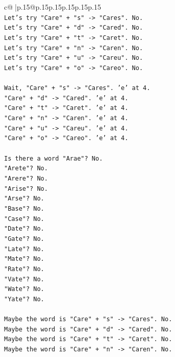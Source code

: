 \documentclass{article}
\begin{document}
{\begin{supertabular}{c@{$\;$}|p{.15\linewidth}@{}p{.15\linewidth}p{.15\linewidth}p{.15\linewidth}p{.15\linewidth}p{.15\linewidth}}
{{{\\ 
\texttt{Let's try "Care" + "s" {-}> "Cares". No.} \\
\texttt{Let's try "Care" + "d" {-}> "Cared". No.} \\
\texttt{Let's try "Care" + "t" {-}> "Caret". No.} \\
\texttt{Let's try "Care" + "n" {-}> "Caren". No.} \\
\texttt{Let's try "Care" + "u" {-}> "Careu". No.} \\
\texttt{Let's try "Care" + "o" {-}> "Careo". No.} \\
\\ 
\texttt{Wait, "Care" + "s" {-}> "Cares". 'e' at 4.} \\
\texttt{"Care" + "d" {-}> "Cared". 'e' at 4.} \\
\texttt{"Care" + "t" {-}> "Caret". 'e' at 4.} \\
\texttt{"Care" + "n" {-}> "Caren". 'e' at 4.} \\
\texttt{"Care" + "u" {-}> "Careu". 'e' at 4.} \\
\texttt{"Care" + "o" {-}> "Careo". 'e' at 4.} \\
\\ 
\texttt{Is there a word "Arae"? No.} \\
\texttt{"Arete"? No.} \\
\texttt{"Arere"? No.} \\
\texttt{"Arise"? No.} \\
\texttt{"Arse"? No.} \\
\texttt{"Base"? No.} \\
\texttt{"Case"? No.} \\
\texttt{"Date"? No.} \\
\texttt{"Gate"? No.} \\
\texttt{"Late"? No.} \\
\texttt{"Mate"? No.} \\
\texttt{"Rate"? No.} \\
\texttt{"Vate"? No.} \\
\texttt{"Wate"? No.} \\
\texttt{"Yate"? No.} \\
\\ 
\texttt{Maybe the word is "Care" + "s" {-}> "Cares". No.} \\
\texttt{Maybe the word is "Care" + "d" {-}> "Cared". No.} \\
\texttt{Maybe the word is "Care" + "t" {-}> "Caret". No.} \\
\texttt{Maybe the word is "Care" + "n" {-}> "Caren". No.} \\
}}}
\end{supertabular}}
\end{document}
